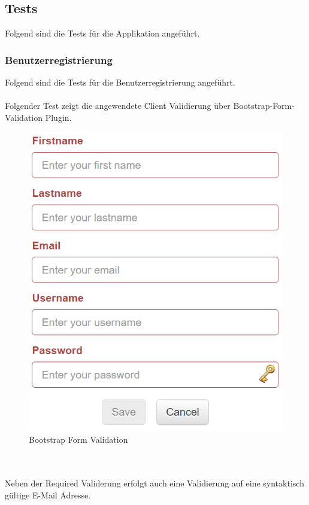 \documentclass[11pt, a4paper, twoside]{article}   	%
\begin{document}
\subsection{Tests}
Folgend sind die Tests für die Applikation angeführt.
\subsubsection{Benutzerregistrierung}
Folgend sind die Tests für die Benutzerregistrierung angeführt.\\\\
Folgender Test zeigt die angewendete Client Validierung über Bootstrap-Form-Validation Plugin. 
\begin{figure}[h]
	\centering
	\includegraphics[scale=0.5]{images/registration_client_validation_full.PNG}
	\caption
	{Bootstrap Form Validation}
\end{figure}\\\\
Neben der Required Validerung erfolgt auch eine Validierung auf eine syntaktisch gültige E-Mail Adresse.
\end{document}
